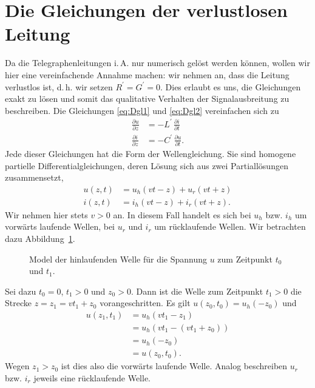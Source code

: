 \documentclass[paper=a4, parskip=half-, ngerman, fontsize=11pt]{scrreprt}
\begin{document}
\section{Die Gleichungen der verlustlosen Leitung}
\label{VerlustlosesModel}
Da die Telegraphenleitungen i.\,A. nur numerisch gelöst werden können, wollen wir hier eine vereinfachende Annahme
machen: wir nehmen an, dass die Leitung verlustlos ist, d.\,h. wir setzen \mbox{$R^{\prime} = G^{\prime} = 0$}. Dies
erlaubt es uns, die Gleichungen exakt zu lösen und somit das qualitative Verhalten der Signalausbreitung zu
beschreiben. Die Gleichungen \eqref{eq:Dgl1} und \eqref{eq:Dgl2} vereinfachen sich zu
\begin{align}
    \frac{\partial u}{\partial z} &= - L^{\prime} \, \frac{\partial i}{\partial t} \label{eq:Dgl7} \\[1ex]
    \frac{\partial i}{\partial z} &= - C^{\prime} \, \frac{\partial u}{\partial t} \label{eq:Dgl8} .
\end{align}
Jede dieser Gleichungen hat die Form der Wellengleichung. Sie sind homogene partielle Differentialgleichungen, deren
Lösung sich aus zwei Partiallösungen zusammensetzt,
\begin{align}
u(z, t) &= u_{h}(v t - z) + u_{r}(v t + z) \label{eq:AllgEq1} \\[1ex]
i(z, t) &= i_{h}(v t - z) + i_{r}(v t + z) \label{eq:AllgEq2}.
\end{align}
Wir nehmen hier stets $v > 0$ an. In diesem Fall handelt es sich bei $u_{h}$ bzw. $i_{h}$ um vorwärts laufende Wellen,
bei $u_{r}$ und $i_{r}$ um rücklaufende Wellen. Wir betrachten dazu Abbildung~\ref{VorwaertsWelle}.
\begin{figure}[!htb]
    \begin{center}
        
        \caption{Model der hinlaufenden Welle für die Spannung $u$ zum Zeitpunkt $t_{0}$ und $t_{1}$.}
        \label{VorwaertsWelle}
    \end{center}
\end{figure}
Sei dazu $t_{0} = 0$, $t_{1} > 0$ und $z_{0} > 0$. Dann ist die Welle zum Zeitpunkt $t_{1} > 0$ die Strecke
$z = z_{1} = v t_{1} + z_{0}$ vorangeschritten. Es gilt $u(z_{0}, t_{0}) = u_{h}(-z_{0})$ und
\begin{align*}
    u(z_{1}, t_{1}) &= u_{h}(v t_{1} - z_{1}) \\
                    &= u_{h}(v t_{1} - (v t_{1} + z_{0})) \\
                    &= u_{h}(- z_{0}) \\
                    &= u(z_{0}, t_{0}).
\end{align*}
Wegen $z_{1} > z_{0}$ ist dies also die vorwärts laufende Welle. Analog beschreiben $u_{r}$ bzw. $i_{r}$ jeweils eine
rücklaufende Welle.
\end{document}
